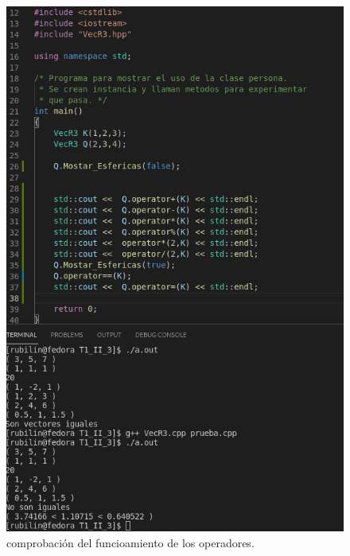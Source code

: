 \documentclass[11pt]{article}
\begin{document}
\begin{figure}[H]
	\centering
	\includegraphics[width=0.4\linewidth]{img9}
	\caption{comprobación del funcioamiento de los operadores. }
\end{figure}





	
	
	
	\vspace{0.1 in}
	
\end{document}
